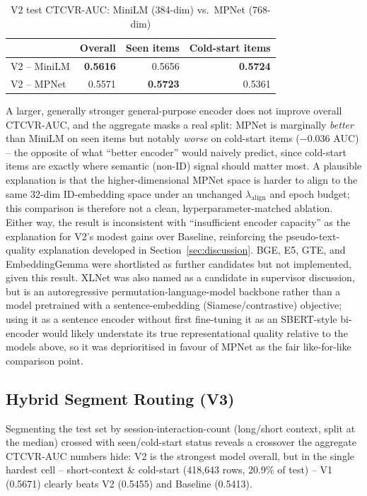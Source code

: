 \begin{table}[h]
\centering
\caption{V2 test CTCVR-AUC: MiniLM (384-dim) vs.\ MPNet (768-dim)}
\label{tab:mpnet-vs-minilm}
\begin{tabular}{lrrr}
\toprule
 & Overall & Seen items & Cold-start items \\
\midrule
V2 -- MiniLM & \textbf{0.5616} & 0.5656 & \textbf{0.5724} \\
V2 -- MPNet  & 0.5571 & \textbf{0.5723} & 0.5361 \\
\bottomrule
\end{tabular}
\end{table}

A larger, generally stronger general-purpose encoder does not improve overall CTCVR-AUC, and the aggregate masks a real split: MPNet is marginally \emph{better} than MiniLM on seen items but notably \emph{worse} on cold-start items ($-0.036$ AUC) -- the opposite of what ``better encoder'' would naively predict, since cold-start items are exactly where semantic (non-ID) signal should matter most. A plausible explanation is that the higher-dimensional MPNet space is harder to align to the same 32-dim ID-embedding space under an unchanged $\lambda_{\text{align}}$ and epoch budget; this comparison is therefore not a clean, hyperparameter-matched ablation. Either way, the result is inconsistent with ``insufficient encoder capacity'' as the explanation for V2's modest gains over Baseline, reinforcing the pseudo-text-quality explanation developed in Section~\ref{sec:discussion}. BGE, E5, GTE, and EmbeddingGemma were shortlisted as further candidates but not implemented, given this result. XLNet \cite{yang2019xlnet} was also named as a candidate in supervisor discussion, but is an autoregressive permutation-language-model backbone rather than a model pretrained with a sentence-embedding (Siamese/contrastive) objective; using it as a sentence encoder without first fine-tuning it as an SBERT-style bi-encoder would likely understate its true representational quality relative to the models above, so it was deprioritised in favour of MPNet as the fair like-for-like comparison point.

\subsection{Hybrid Segment Routing (V3)}
\label{sec:v3}

Segmenting the test set by session-interaction-count (long/short context, split at the median) crossed with seen/cold-start status reveals a crossover the aggregate CTCVR-AUC numbers hide: V2 is the strongest model overall, but in the single hardest cell -- short-context \& cold-start (418{,}643 rows, 20.9\% of test) -- V1 (0.5671) clearly beats V2 (0.5455) and Baseline (0.5413).

